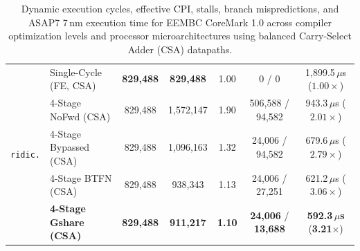\begin{table}[htbp]
{\begin{tabular}{|l|l|c|c|c|c|c|}
\hline
\multirow{5}{*}{\texttt{ridic.}} 
 & Single-Cycle (FE, CSA) & \textbf{829,488} & \textbf{829,488} & 1.00 & 0 / 0             & 1,899.5\,$\mu$s ($1.00\times$) \\
 & 4-Stage NoFwd (CSA)    & 829,488   & 1,572,147 & 1.90 & 506,588 / 94,582   & 943.3\,$\mu$s ($2.01\times$) \\
 & 4-Stage Bypassed (CSA) & 829,488   & 1,096,163 & 1.32 & 24,006 / 94,582    & 679.6\,$\mu$s ($2.79\times$) \\
 & 4-Stage BTFN (CSA)     & 829,488   & 938,343   & 1.13 & 24,006 / 27,251    & 621.2\,$\mu$s ($3.06\times$) \\
 & \textbf{4-Stage Gshare (CSA)} & \textbf{829,488} & \textbf{911,217} & \textbf{1.10} & \textbf{24,006} / \textbf{13,688} & \textbf{592.3\,$\mu$s} (\textbf{3.21$\times$}) \\
\hline
\end{tabular}%
}
\caption{Dynamic execution cycles, effective CPI, stalls, branch mispredictions, and ASAP7 7\,nm execution time for EEMBC CoreMark 1.0 across compiler optimization levels and processor microarchitectures using balanced Carry-Select Adder (CSA) datapaths.}\label{tab:compiler_dynamic_coremark}
\end{table}

